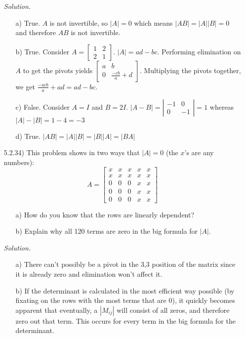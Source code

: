 \documentclass[12pt,pdftex]{article}
\begin{document}
\begin{itemize}
\textit{Solution.}
\begin{itemize}
\item[a)] True. $A$ is not invertible, so $|A|=0$ which means $|AB|=|A||B|=0$ and therefore $AB$ is not invertible.
\item[b)] True. Consider $A=\begin{bmatrix} 1 & 2 \\ 2 & 1\end{bmatrix}$. $|A|=ad-bc$. Performing elimination on $A$ to get the pivots yields $\begin{bmatrix} a & b \\ 0 & \frac{-cb}{a}+d\end{bmatrix}$. Multiplying the pivots together, we get $\frac{-acb}{a}+ad=ad-bc$.
\item[c)] False. Consider $A=I$ and $B=2I$. $|A-B|=\left|\begin{array}{ccc} -1 & 0 \\ 0 & -1\end{array}\right|=1$ whereas $|A|-|B|=1-4=-3$
\item[d)] True. $|AB|=|A||B|=|B||A|=|BA|$
\end{itemize}

\item[5.2.34)] This problem shows in two ways that $|A|=0$ (the $x$'s are any numbers):
\[A=\left[\begin{array}{ccccc}
x & x & x & x & x\\ 
x & x & x & x & x\\ 
0 & 0 & 0 & x & x\\
0 & 0 & 0 & x & x\\
0 & 0 & 0 & x & x
\end{array}\right]\]
\begin{itemize}
\item[a)] How do you know that the rows are linearly dependent?
\item[b)] Explain why all 120 terms are zero in the big formula for $|A|$.
\end{itemize}

\textit{Solution.}
\begin{itemize}
\item[a)] There can't possibly be a pivot in the 3,3 position of the matrix since it is already zero and elimination won't affect it.
\item[b)] If the determinant is calculated in the most efficient way possible (by fixating on the rows with the most terms that are 0), it quickly becomes apparent that eventually, a $|M_{ij}|$ will consist of all zeros, and therefore zero out that term. This occurs for every term in the big formula for the determinant.
\end{itemize}

\end{itemize}
\end{document}
